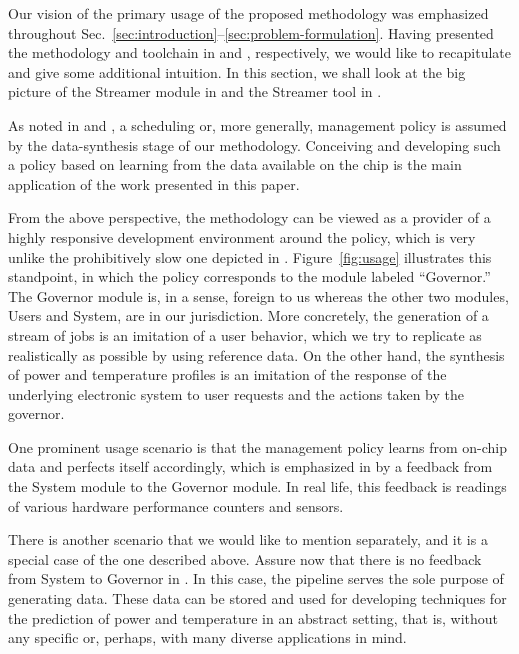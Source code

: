 
Our vision of the primary usage of the proposed methodology was emphasized
throughout Sec.~\ref{sec:introduction}--\ref{sec:problem-formulation}. Having
presented the methodology and toolchain in  and
, respectively, we would like to recapitulate and give some
additional intuition. In this section, we shall look at the big picture of the
Streamer module in  and the Streamer tool in .

As noted in  and , a scheduling or, more
generally, management policy is assumed by the data-synthesis stage of our
methodology. Conceiving and developing such a policy based on learning from the
data available on the chip is the main application of the work presented in this
paper.

From the above perspective, the methodology can be viewed as a provider of a
highly responsive development environment around the policy, which is very
unlike the prohibitively slow one depicted in .
Figure~\ref{fig:usage} illustrates this standpoint, in which the policy
corresponds to the module labeled ``Governor.'' The Governor module is, in a
sense, foreign to us whereas the other two modules, Users and System, are in our
jurisdiction. More concretely, the generation of a stream of jobs is an
imitation of a user behavior, which we try to replicate as realistically as
possible by using reference data. On the other hand, the synthesis of power and
temperature profiles is an imitation of the response of the underlying
electronic system to user requests and the actions taken by the governor.

One prominent usage scenario is that the management policy learns from on-chip
data and perfects itself accordingly, which is emphasized in  by a
feedback from the System module to the Governor module. In real life, this
feedback is readings of various hardware performance counters and sensors.

There is another scenario that we would like to mention separately, and it is a
special case of the one described above. Assure now that there is no feedback
from System to Governor in . In this case, the pipeline serves the
sole purpose of generating data. These data can be stored and used for
developing techniques for the prediction of power and temperature in an abstract
setting, that is, without any specific or, perhaps, with many diverse
applications in mind.
